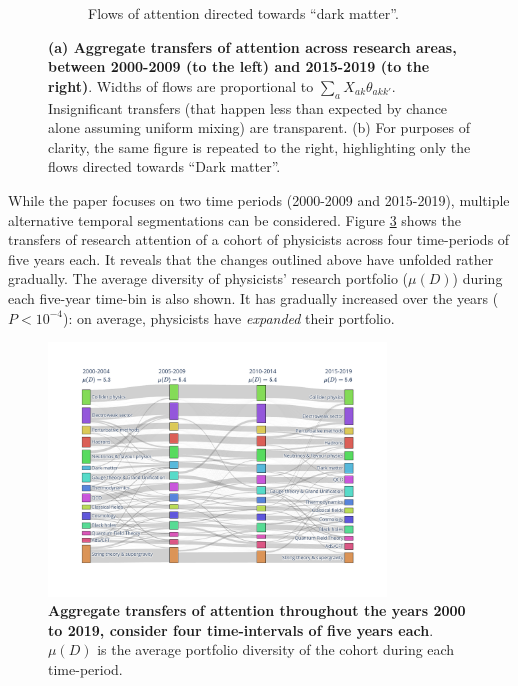 \documentclass{article}
\begin{document}
\begin{figure}[h]
\begin{subfigure}[t]{0.47\textwidth}
    \caption{\label{fig:sankey_b}Flows of attention directed towards ``dark matter''.}
\end{subfigure}
     \caption{\textbf{(a) Aggregate transfers of attention across research areas, between 2000-2009 (to the left) and 2015-2019 (to the right)}. Widths of flows are proportional to $\sum_a X_{ak}\theta_{akk'}$. Insignificant transfers (that happen less than expected by chance alone assuming uniform mixing) are transparent. (b) For purposes of clarity, the same figure is repeated to the right, highlighting only the flows directed towards ``Dark matter''.}
     \label{fig:sankey}
 \end{figure}

While the paper focuses on two time periods (2000-2009 and 2015-2019), multiple alternative temporal segmentations can be considered. Figure \ref{fig:sankey_five_years} shows the transfers of research attention of a cohort of physicists across four time-periods of five years each. It reveals that the changes outlined above have unfolded rather gradually. The average diversity of physicists' research portfolio ($\mu(D)$) during each five-year time-bin is also shown. It has gradually increased over the years ($P<10^{-4}$): on average, physicists have \textit{expanded} their portfolio.

\begin{figure}[!h]
    \centering
    \includegraphics[width=0.8\textwidth,trim={2.1cm 1.5cm 2.1cm 1.5cm},clip]{sankey_four.pdf}
    \caption{\textbf{Aggregate transfers of attention throughout the years 2000 to 2019, consider four time-intervals of five years each}. $\mu(D)$ is the average portfolio diversity of the cohort during each time-period.}
    \label{fig:sankey_five_years}
\end{figure}
\end{document}
